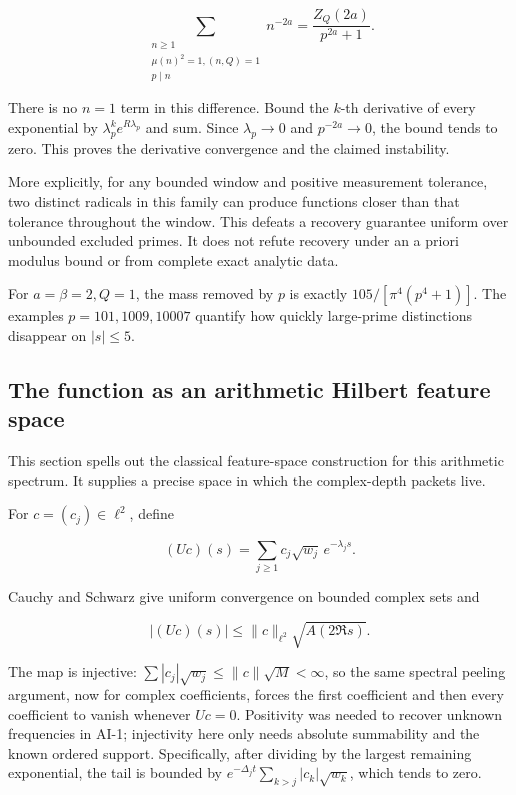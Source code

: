 \[
 \sum_{\substack{n\ge1\\\mu(n)^2=1,(n,Q)=1\\p\mid n}}n^{-2a}
 =\frac{Z_Q(2a)}{p^{2a}+1}.
\]

There is no \(n=1\) term in this difference. Bound the \(k\)-th
derivative of every exponential by \(\lambda_p^ke^{R\lambda_p}\) and
sum. Since \(\lambda_p\to0\) and \(p^{-2a}\to0\), the bound tends to
zero. This proves the derivative convergence and the claimed
instability.

More explicitly, for any bounded window and positive measurement
tolerance, two distinct radicals in this family can produce functions
closer than that tolerance throughout the window. This defeats a
recovery guarantee uniform over unbounded excluded primes. It does not
refute recovery under an a priori modulus bound or from complete exact
analytic data.

For \(a=\beta=2,Q=1\), the mass removed by \(p\) is exactly
\(105/[\pi^4(p^4+1)]\). The examples \(p=101,1009,10007\) quantify how
quickly large-prime distinctions disappear on \(|s|\le5\).

\hypertarget{the-function-as-an-arithmetic-hilbert-feature-space}{%
\subsection{The function as an arithmetic Hilbert feature
space}\label{the-function-as-an-arithmetic-hilbert-feature-space}}

This section spells out the classical feature-space construction for
this arithmetic spectrum. It supplies a precise space in which the
complex-depth packets live.

For \(c=(c_j)\in\ell^2\), define

\[
 (Uc)(s)=\sum_{j\ge1}c_j\sqrt{w_j}\,e^{-\lambda_js}.
\]

Cauchy and Schwarz give uniform convergence on bounded complex sets and

\[
 |(Uc)(s)|\le\|c\|_{\ell^2}\sqrt{A(2\Re s)}.
\]

The map is injective: \(\sum|c_j|\sqrt{w_j}\le\|c\|\sqrt M<\infty\), so
the same spectral peeling argument, now for complex coefficients, forces
the first coefficient and then every coefficient to vanish whenever
\(Uc=0\). Positivity was needed to recover unknown frequencies in AI-1;
injectivity here only needs absolute summability and the known ordered
support. Specifically, after dividing by the largest remaining
exponential, the tail is bounded by
\(e^{-\Delta_jt}\sum_{k>j}|c_k|\sqrt{w_k}\), which tends to zero.

